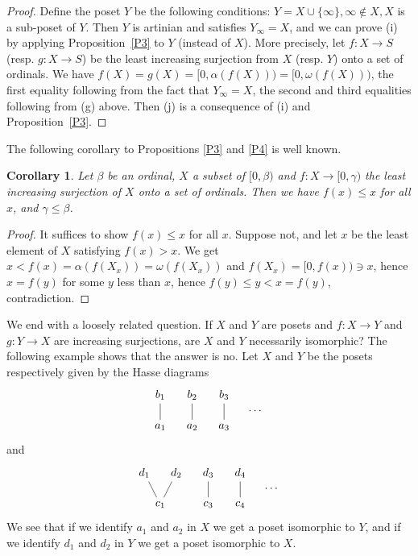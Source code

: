 \documentclass[12pt,letterpaper]{article}
\newtheorem{cor}[thm]{Corollary}
\begin{document}
\begin{proof}
Define the poset $Y$ be the following conditions: $Y=X\cup\{\infty\},\infty\notin X,X$ is a sub-poset of $Y$. Then $Y$ is artinian and satisfies $Y_\infty=X$, and we can prove (i) by applying Proposition~\ref{P3} to $Y$ (instead of $X$). More precisely, let $f:X\to S$ (resp. $g:X\to S$) be the least increasing surjection from $X$ (resp. $Y$) onto a set of ordinals. We have $f(X)=g(X)=[0,\alpha(f(X)))=[0,\omega(f(X)))$, the first equality following from the fact that $Y_\infty=X$, the second and third equalities following from (g) above. %
Then (j) is a consequence of (i) and Proposition~\ref{P3}. 
\end{proof} 

The following corollary to Propositions \ref{P3} and \ref{P4} is well known. 

\begin{cor}
Let $\beta$ be an ordinal, $X$ a subset of $[0,\beta)$ and $f:X\to[0,\gamma)$ the least increasing surjection of $X$ onto a set of ordinals. Then we have $f(x)\le x$ for all $x$, and $\gamma\le\beta$. 
\end{cor} 

\begin{proof}
It suffices to show $f(x)\le x$ for all $x$. Suppose not, and let $x$ be the least element of $X$ satisfying $f(x)>x$. We get $x<f(x)=\alpha(f(X_x))=\omega(f(X_x))$ and $f(X_x)=[0,f(x))\ni x$, hence $x=f(y)$ for some $y$ less than $x$, hence $f(y)\le y<x=f(y)$, contradiction. 
\end{proof} 


We end with a loosely related question. If $X$ and $Y$ are posets and $f:X\to Y$ and $g:Y\to X$ are increasing surjections, are $X$ and $Y$ necessarily isomorphic? The following example shows that the answer is no. Let $X$ and $Y$ be the posets respectively given by the Hasse diagrams 
$$
\begin{tikzpicture}[scale=.5]
  \node (b1) at (-3,0) {$b_1$};
  \node (b2) at (-1,0) {$b_2$};
  \node (b3) at (1,0) {$b_3$};
  \node (a1) at (-3,-2) {$a_1$};
  \node (a2) at (-1,-2) {$a_2$};
  \node (a3) at (1,-2) {$a_3$};
  \node (e) at (3,-1) {$\cdots$};
  \draw (b1) -- (a1) (b2) -- (a2) (b3) -- (a3);
\end{tikzpicture}
$$ 
and
$$
\begin{tikzpicture}[scale=.5]
  \node (d1) at (-3,0) {$d_1$};
  \node (d2) at (-1,0) {$d_2$};
  \node (d3) at (1,0) {$d_3$};
  \node (d4) at (3,0) {$d_4$};
  \node (c1) at (-2,-2) {$c_1$};
  \node (c3) at (1,-2) {$c_3$};
  \node (c4) at (3,-2) {$c_4$};
  \node (e) at (5,-1) {$\cdots$};
  \draw (d1) -- (c1) -- (d2) (d3) -- (c3) (d4) -- (c4);
\end{tikzpicture}
$$ %
We see that if we identify $a_1$ and $a_2$ in $X$ we get a poset isomorphic to $Y$, and if we identify $d_1$ and $d_2$ in $Y$ we get a poset isomorphic to $X$. 
\end{document}

